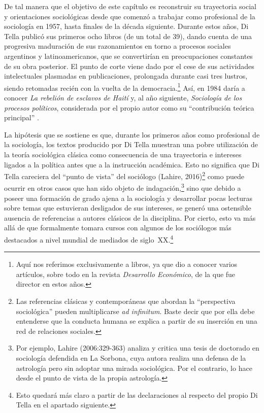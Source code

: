 De tal manera que el objetivo de este capítulo es reconstruir su trayectoria social y orientaciones sociológicas desde que comenzó a trabajar como profesional de la sociología en 1957, hasta finales de la década siguiente. Durante estos años, Di Tella publicó sus primeros ocho libros (de un total de 39), dando cuenta de una progresiva maduración de sus razonamientos en torno a procesos sociales argentinos y latinoamericanos, que se convertirían en preocupaciones constantes de su obra posterior. El punto de corte viene dado por el cese de sus actividades intelectuales plasmadas en publicaciones, prolongada durante casi tres lustros, siendo retomadas recién con la vuelta de la democracia.\footnote{Aquí nos referimos exclusivamente a libros, ya que dio a conocer varios artículos, sobre todo en la revista \emph{Desarrollo Económico}, de la que fue director en estos años.} Así, en 1984 daría a conocer \emph{La rebelión de esclavos de Haití} y, al año siguiente, \emph{Sociología de los procesos políticos}, considerada por el propio autor como su \enquote{contribución teórica principal} \parencite[289]{1553-CAMOU2009}.

La hipótesis que se sostiene es que, durante los primeros años como profesional de la sociología, los textos producido por Di Tella muestran una pobre utilización de la teoría sociológica clásica como consecuencia de una trayectoria e intereses ligados a la política antes que a la instrucción académica. Esto no significa que Di Tella careciera del \enquote{punto de vista} del sociólogo \parencite{1516-ALEXANDER2008,1522-BAUMAN2007}(Lahire, 2016)\footnote{Las referencias clásicas y contemporáneas que abordan la \enquote{perspectiva sociológica} pueden multiplicarse \emph{ad infinitum}. Baste decir que por ella debe entenderse que la conducta humana se explica a partir de su inserción en una red de relaciones sociales.} como puede ocurrir en otros casos que han sido objeto de indagación,\footnote{Por ejemplo, Lahire (2006:329-363) analiza y critica una tesis de doctorado en sociología defendida en La Sorbona, cuya autora realiza una defensa de la astrología pero sin adoptar una mirada sociológica. Por el contrario, lo hace desde el punto de vista de la propia astrología.} sino que debido a poseer una formación de grado ajena a la sociología y desarrollar pocas lecturas sobre temas que estuvieran desligados de sus intereses, se generó una ostensible ausencia de referencias a autores clásicos de la disciplina. Por cierto, esto va más allá de que formalmente tomara cursos con algunos de los sociólogos más destacados a nivel mundial de mediados de siglo~XX.\footnote{Esto quedará más claro a partir de las declaraciones al respecto del propio Di Tella en el apartado siguiente.}

